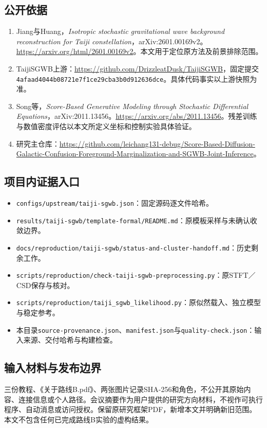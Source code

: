 \documentclass[UTF8,fontset=none,a4paper,11pt]{ctexart}
\newcommand{\code}[1]{\texttt{\nolinkurl{#1}}}
\begin{document}
\subsection{公开依据}
\begin{enumerate}
\item Jiang与Huang，\emph{Isotropic stochastic gravitational wave background reconstruction for Taiji constellation}，arXiv:2601.00169v2。\url{https://arxiv.org/html/2601.00169v2}。本文用于定位原方法及前景排除范围。
\item TaijiSGWB上游：\url{https://github.com/DrizzleatDusk/TaijiSGWB}，固定提交\code{4afaad4044b08721e7f1ce29cba3b0d912636dce}。具体代码事实以上游快照为准。
\item Song等，\emph{Score-Based Generative Modeling through Stochastic Differential Equations}，arXiv:2011.13456。\url{https://arxiv.org/abs/2011.13456}。残差训练与数值密度评估以本文所定义坐标和控制实验具体验证。
\item 研究主仓库：\url{https://github.com/leichang131-debug/Score-Based-Diffusion-Galactic-Confusion-Foreground-Marginalization-and-SGWB-Joint-Inference}。
\end{enumerate}
\subsection{项目内证据入口}
\begin{itemize}
\item \code{configs/upstream/taiji-sgwb.json}：固定源码逐文件哈希。
\item \code{results/taiji-sgwb/template-formal/README.md}：原模板采样与未确认收敛边界。
\item \code{docs/reproduction/taiji-sgwb/status-and-cluster-handoff.md}：历史剩余工作。
\item \code{scripts/reproduction/check-taiji-sgwb-preprocessing.py}：原STFT／CSD保存与核对。
\item \code{scripts/reproduction/taiji_sgwb_likelihood.py}：原似然载入、独立模型与稳定参考。
\item 本目录\code{source-provenance.json}、\code{manifest.json}与\code{quality-check.json}：输入来源、交付哈希与构建检查。
\end{itemize}
\subsection{输入材料与发布边界}
三份教程、《关于路线B.pdf》、两张图片记录SHA-256和角色，不公开其原始内容、连接信息或个人路径。会议摘要作为用户提供的研究方向材料，不视作可执行程序、自动消息或访问授权。保留原研究框架PDF，新增本文并明确新旧范围。本文不包含任何已完成路线B实验的虚构结果。
\end{document}
